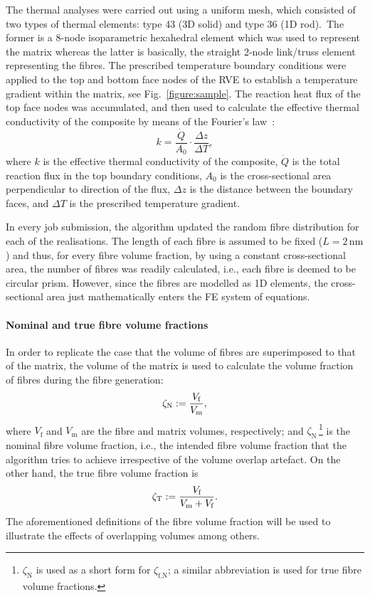 	\red
	The thermal analyses were carried out using a uniform mesh, which consisted of two types of thermal elements: type 43 (3D solid) and type 36 (1D rod).\bl\ The former is a 8-node isoparametric hexahedral element which was used to represent the matrix whereas the latter is basically, the straight 2-node link/truss element representing the fibres. The prescribed temperature boundary conditions were applied to the top and bottom face nodes of the RVE to establish a temperature gradient within the matrix, see Fig.~\ref{figure:sample}. The reaction heat flux of the top face nodes was accumulated, and then used to calculate the effective thermal conductivity of the composite by means of the Fourier's law~\autocite{Fiedler.2009}:
	\begin{equation}
	k=\frac{\dot{Q}}{A_0}\cdot\frac{\Delta z}{\Delta T},
	\end{equation}
	where $k$ is the effective thermal conductivity of the composite, $\dot{Q}$ is the total reaction flux in the top boundary conditions, $A_0$ is the cross-sectional area perpendicular to direction of the flux, $\Delta z$ is the distance between the boundary faces, and $\Delta T$ is the prescribed temperature gradient.

	
	\red
	In every job submission, the algorithm updated the random fibre distribution for each of the realisations. The length of each fibre is assumed to be fixed ($L=2\,\text{nm}$) and thus, for every fibre volume fraction, by using a constant cross-sectional area, the number of fibres was readily calculated, i.e., each fibre is deemed to be circular prism. However, since the fibres are modelled as 1D elements, the cross-sectional area just mathematically enters the FE system of equations.
	
	\paragraph{Nominal and true fibre volume fractions} In order to replicate the case that the volume of fibres are superimposed to that of the matrix, the volume of the matrix is used to calculate the volume fraction of fibres during the fibre generation: 
	\begin{equation}
	\zeta_\text{N} \mathrel{:=} \frac{V_\text{f}}{V_\text{m}},
	\end{equation}
	where $V_\text{f}$ and $V_\text{m}$ are the fibre and matrix volumes, respectively; and $\zeta_\text{N}$\,\footnote{$\zeta_\text{N}$ is used as a short form for $\zeta_{\text{f},\text{N}}$; a similar abbreviation is used for true fibre volume fractions.} is the nominal fibre volume fraction, i.e., the intended fibre volume fraction that the algorithm tries to achieve irrespective of the volume overlap artefact. On the other hand, the true fibre volume fraction is
	\begin{equation}
	\zeta_\text{T} \mathrel{:=} \frac{V_\text{f}}{V_\text{m}+V_\text{f}}.
	\end{equation}	
	The aforementioned definitions of the fibre volume fraction will be used to illustrate the effects of overlapping volumes among others.
	
